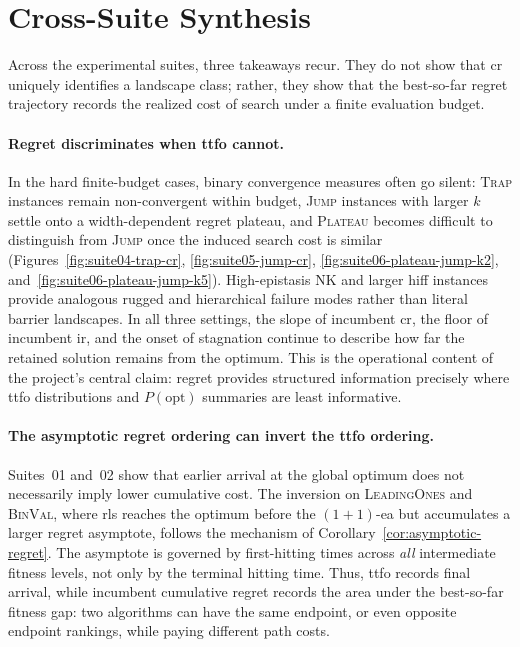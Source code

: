 \section{Cross-Suite Synthesis}
\label{sec:results:synthesis}

Across the experimental suites, three takeaways recur. They do not
show that \acrshort{cr} uniquely identifies a landscape class; rather,
they show that the best-so-far regret trajectory records the realized
cost of search under a finite evaluation budget.

\paragraph{Regret discriminates when \acrshort{ttfo} cannot.}
In the hard finite-budget cases, binary convergence measures often go
silent: \textsc{Trap} instances remain non-convergent within budget,
\textsc{Jump} instances with larger $k$ settle onto a width-dependent
regret plateau, and \textsc{Plateau} becomes difficult to distinguish
from \textsc{Jump} once the induced search cost is similar
(Figures~\ref{fig:suite04-trap-cr}, \ref{fig:suite05-jump-cr},
\ref{fig:suite06-plateau-jump-k2}, and~\ref{fig:suite06-plateau-jump-k5}).
High-epistasis NK and larger \acrshort{hiff} instances provide analogous
rugged and hierarchical failure modes rather than literal barrier
landscapes. In all three settings, the slope of incumbent \acrshort{cr},
the floor of incumbent \acrshort{ir}, and the onset of stagnation
continue to describe how far the retained solution remains from the
optimum. This is the operational content of the project's central claim:
regret provides structured information precisely where \acrshort{ttfo}
distributions and $P(\mathrm{opt})$ summaries are least informative.

\paragraph{The asymptotic regret ordering can invert the
\acrshort{ttfo} ordering.}
Suites~01 and~02 show that earlier arrival at the global optimum does
not necessarily imply lower cumulative cost. The inversion on
\textsc{LeadingOnes} and \textsc{BinVal}, where \acrshort{rls}
reaches the optimum before the $(1+1)$-\acrshort{ea} but accumulates a
larger regret asymptote, follows the mechanism of
Corollary~\ref{cor:asymptotic-regret}. The asymptote is governed by
first-hitting times across \emph{all} intermediate fitness levels, not
only by the terminal hitting time. Thus, \acrshort{ttfo} records final
arrival, while incumbent cumulative regret records the area under the
best-so-far fitness gap: two algorithms can have the same endpoint, or
even opposite endpoint rankings, while paying different path costs.

